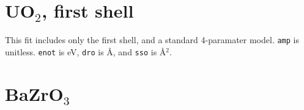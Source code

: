 \documentclass{article}
\let\stdsection\section
\renewcommand\section{\newpage\stdsection}
\begin{document}
\renewcommand{\feffmaterial}{UO2}
\renewcommand{\feffrone}{3}
\renewcommand{\feffrtwo}{4}
\renewcommand{\feffrthree}{5}
\renewcommand{\feffrfour}{5.5}
\renewcommand{\feffrfive}{6}
\renewcommand{\fefffirst}{}

\scriptsize

\fitplots


\section{UO$_2$, first shell}

\normalsize
This fit includes only the first shell, and a standard 4-paramater
model.  \texttt{amp} is unitless.  \texttt{enot} is eV, \texttt{dro}
is \AA, and \texttt{sso} is \AA$^2$.

\renewcommand{\fefffirst}{_1st}

\small

\fitplots





\section{BaZrO$_3$}
\normalsize
\end{document}

